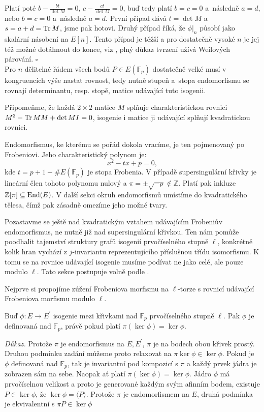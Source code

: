 \documentclass[12pt]{report}
\begin{document}
Platí poté $b - \frac{b t}{\det M} = 0$, $c - \frac{c t}{\det M} = 0$, buď tedy platí $b=c=0$ a~následně $a=d$, nebo $b=c=0$ a~následně $a=d$. První případ dává $t = \det M$ a $s = a+d = \operatorname{Tr} M$, jsme pak hotovi. Druhý případ říká, že $\phi \vert _n$ působí jako skalární násobení na $E[n]$. Tento případ je těžší a pro dostatečně vysoké $n$ je jej též možné dotáhnout do konce, viz \cite[Thm. 7.17]{Sutherland}, plný důkaz tvrzení užívá Weilových párování. \hfill $\square$\\ 

Pro $n$ dělitelné řádem všech bodů $P \in E(\mathbb{F}_p)$ dostatečně velké musí v kongruencích výše nastat rovnost, tedy nutně stupeň a~stopa endomorfismu se rovnají determinantu, resp. stopě, matice udávající tuto isogenii.

Připomeňme, že každá $2 \times 2$ matice $M$ splňuje charakteristickou rovnici $M^2 - \operatorname{Tr} M M + \det M I = 0$, isogenie i matice ji udávající splňují  kvadratickou rovnici. 

Endomorfismus, ke kterému se pořád dokola vracíme, je ten pojmenovaný po Frobeniovi. Jeho charakteristický polynom je:
\begin{equation*}
x^2 - tx + p = 0,
\end{equation*}
kde $t = p+1-\# E(\mathbb{F}_p)$ je stopa Frobenia. V případě supersingulární křivky je lineární člen tohoto polynomu nulový a $\pi =  \pm \sqrt{-p} \not\in \mathbb{Z}$. Platí pak inkluze $\mathbb{Z}[\pi] \subseteq \operatorname{End}(E)$. V další sekci okruh endomorfismů umístíme do kvadratického tělesa, čímž pak zásadně omezíme jeho možné tvary.

Pozastavme se ještě nad kvadratickým vztahem udávajícím Frobeniův endomorfismus, ne nutně již nad supersingulární křivkou. Ten nám pomůže poodhalit tajemství struktury grafů isogenií prvočíselného stupně $\ell$, konkrétně kolik hran vychází z $j$-invariantu reprezentujícího příslušnou třídu isomorfismu. K tomu se na rovnice udávající isogenie musíme podívat ne jako celé, ale pouze modulo $\ell$. Tato sekce postupuje volně podle \cite[Sec. 6]{Schoof2}.

Nejprve si propojíme zúžení Frobeniova morfismu na $\ell$-torze s rovnicí udávající Frobeniova morfismu modulo $\ell$.

\begin{lemma}
Buď $\phi : E \longrightarrow E^\prime$ isogenie mezi křivkami nad $\mathbb{F}_p$ prvočíselného stupně $\ell$. Pak $\phi$ je definovaná nad $\mathbb{F}_p$, právě pokud platí $\pi (\ker \phi) = \ker \phi$.
\end{lemma}
\noindent \textit{Důkaz.} Protože $\pi$ je endomorfismus na $E, E^\prime$, $\pi$ je na bodech obou křivek prostý. Druhou podmínku zadání můžeme proto relaxovat na $\pi \ker \phi \in \ker \phi$. Pokud je $\phi$ definovaná nad $\mathbb{F}_p$, tak je invariantní pod kompozicí s $\pi$ a každý prvek jádra je zobrazen sám na sebe. Naopak ať platí $\pi (\ker \phi) = \ker \phi$. Jádro $\phi$ má prvočíselnou velikost a proto je generované každým svým afinním bodem, existuje $P \in \ker \phi$, že $\ker \phi = \langle P \rangle$. Protože $\pi$ je endomorfismem na $E$, druhá podmínka je ekvivalentní s $\pi P \in \ker \phi$
\end{document}
